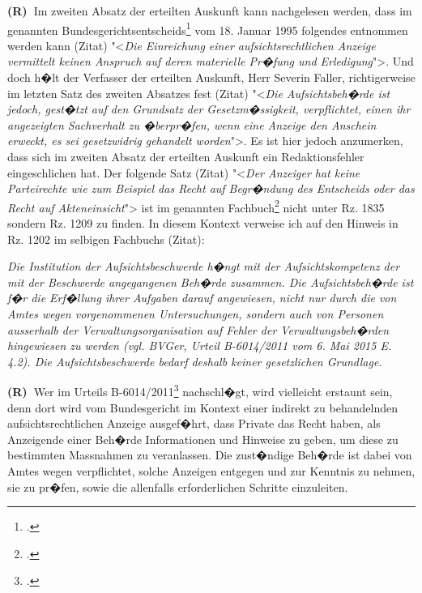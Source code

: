\documentclass[paper=a4,fontsize=12pt, oneside, numbers=noenddot]{scrbook}
\newcounter{rz}
\newcommand{\Rz}{\addtocounter{rz}{1}\textbf{(R\arabic{rz})~}}
\begin{document}
	\Rz Im zweiten Absatz der erteilten Auskunft kann nachgelesen werden, dass im genannten Bundesgerichtsentscheids\footcite[E. 2a]{BGE121I42} vom 18. Januar 1995 folgendes entnommen werden kann (Zitat) "<\textit{Die Einreichung einer aufsichtsrechtlichen Anzeige vermittelt keinen Anspruch auf deren materielle Pr�fung und Erledigung}">. Und doch h�lt der Verfasser der erteilten Auskunft, Herr Severin Faller, richtigerweise im letzten Satz des zweiten Absatzes fest (Zitat) "<\textit{Die Aufsichtsbeh�rde ist jedoch, gest�tzt auf den Grundsatz der Gesetzm�ssigkeit, verpflichtet, einen ihr angezeigten Sachverhalt zu �berpr�fen, wenn eine Anzeige den Anschein erweckt, es sei gesetzwidrig gehandelt worden}">. Es ist hier jedoch anzumerken, dass sich im zweiten Absatz der erteilten Auskunft ein Redaktionsfehler eingeschlichen hat. Der folgende Satz (Zitat) "<\textit{Der Anzeiger hat keine Parteirechte wie zum Beispiel das Recht auf Begr�ndung des Entscheids oder das Recht auf Akteneinsicht}"> ist im genannten Fachbuch\footcite{2008:Haeflin:AllgVerwaltungsrecht} nicht unter  Rz. 1835 sondern Rz. 1209 zu finden. In diesem Kontext verweise ich auf den Hinweis in Rz. 1202 im selbigen Fachbuchs (Zitat):
	\begin{addmargin}[2.5em]{0em}\emph{Die Institution der Aufsichtsbeschwerde h�ngt mit der Aufsichtskompetenz der mit der Beschwerde angegangenen Beh�rde zusammen. Die Aufsichtsbeh�rde ist f�r die Erf�llung ihrer Aufgaben darauf angewiesen, nicht nur durch die von Amtes wegen vorgenommenen Untersuchungen, sondern auch von Personen ausserhalb der Verwaltungsorganisation auf Fehler der Verwaltungsbeh�rden hingewiesen zu werden (vgl. BVGer, Urteil B-6014/2011 vom 6. Mai 2015 E. 4.2). Die Aufsichtsbeschwerde bedarf deshalb keiner gesetzlichen Grundlage.}
	\end{addmargin}
	\Rz Wer im Urteils B-6014/2011\footcite[E. 4.2]{BGE6014:20111} nachschl�gt, wird vielleicht erstaunt sein, denn dort wird vom Bundesgericht im Kontext einer indirekt zu behandelnden aufsichtsrechtlichen Anzeige ausgef�hrt, dass Private das Recht haben, als Anzeigende einer Beh�rde Informationen und Hinweise zu geben, um diese zu bestimmten Massnahmen zu veranlassen. Die zust�ndige Beh�rde ist dabei von Amtes wegen verpflichtet, solche Anzeigen entgegen und zur Kenntnis zu nehmen, sie zu pr�fen, sowie die allenfalls erforderlichen Schritte einzuleiten. 
	
\end{document}
